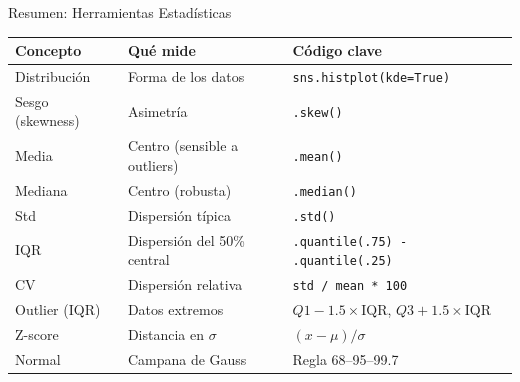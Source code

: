 \documentclass[aspectratio=169, 11pt]{beamer}
\begin{document}
\begin{frame}[shrink=10]{Resumen: Herramientas Estadísticas}
  \vspace{-4pt}
  {\small
  \begin{tabular}{@{}lll@{}}
    \toprule
    \textbf{Concepto} & \textbf{Qué mide} & \textbf{Código clave} \\
    \midrule
    Distribución & Forma de los datos & \texttt{sns.histplot(kde=True)} \\
    Sesgo (skewness) & Asimetría & \texttt{.skew()} \\
    Media & Centro (sensible a outliers) & \texttt{.mean()} \\
    Mediana & Centro (robusta) & \texttt{.median()} \\
    Std & Dispersión típica & \texttt{.std()} \\
    IQR & Dispersión del 50\% central & \texttt{.quantile(.75) - .quantile(.25)} \\
    CV & Dispersión relativa & \texttt{std / mean * 100} \\
    Outlier (IQR) & Datos extremos & $Q1 - 1.5 \times \text{IQR}$, $Q3 + 1.5 \times \text{IQR}$ \\
    Z-score & Distancia en $\sigma$ & $(x - \mu) / \sigma$ \\
    Normal & Campana de Gauss & Regla 68--95--99.7 \\
    \bottomrule
  \end{tabular}
  }
\end{frame}
\end{document}

